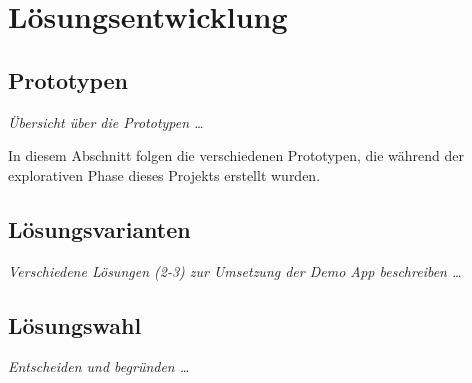 \section{Lösungsentwicklung}

\subsection{Prototypen}
\textit{Übersicht über die Prototypen …} %

In diesem Abschnitt folgen die verschiedenen Prototypen, die während der explorativen Phase dieses Projekts erstellt wurden.









\subsection{Lösungsvarianten}
\textit{Verschiedene Lösungen (2-3) zur Umsetzung der Demo App beschreiben …}

\subsection{Lösungswahl}
\textit{Entscheiden und begründen …}
